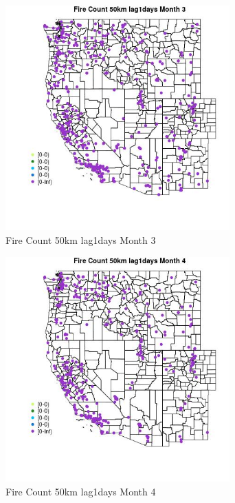 \begin{figure} 
\centering  
\includegraphics[width=0.77\textwidth]{Code_Outputs/Report_ML_input_PM25_Step4_part_e_de_duplicated_aves_compiled_2019-05-18wNAs_MapObsMo3Fire_Count_50km_lag1days.jpg} 
\caption{\label{fig:Report_ML_input_PM25_Step4_part_e_de_duplicated_aves_compiled_2019-05-18wNAsMapObsMo3Fire_Count_50km_lag1days}Fire Count 50km lag1days Month 3} 
\end{figure} 
 

\begin{figure} 
\centering  
\includegraphics[width=0.77\textwidth]{Code_Outputs/Report_ML_input_PM25_Step4_part_e_de_duplicated_aves_compiled_2019-05-18wNAs_MapObsMo4Fire_Count_50km_lag1days.jpg} 
\caption{\label{fig:Report_ML_input_PM25_Step4_part_e_de_duplicated_aves_compiled_2019-05-18wNAsMapObsMo4Fire_Count_50km_lag1days}Fire Count 50km lag1days Month 4} 
\end{figure} 
 

